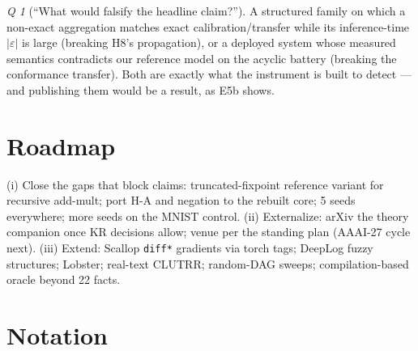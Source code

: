 \documentclass[10pt]{article}
\theoremstyle{remark}
\newtheorem{question}{Q}
\newcommand{\eps}{\varepsilon}
\begin{document}
\begin{question}[``What would falsify the headline claim?'']
A structured family on which a non-exact aggregation matches exact calibration/transfer while its
inference-time $\lvert\eps\rvert$ is large (breaking H8's propagation), or a deployed system whose
measured semantics contradicts our reference model on the acyclic battery (breaking the
conformance transfer). Both are exactly what the instrument is built to detect --- and publishing
them would be a result, as E5b shows.
\end{question}

\section{Roadmap}\label{sec:roadmap}

(i) Close the gaps that block claims: truncated-fixpoint reference variant for recursive add-mult;
port H-A and negation to the rebuilt core; 5 seeds everywhere; more seeds on the MNIST control.
(ii) Externalize: arXiv the theory
companion once KR decisions allow; venue per the standing plan (AAAI-27 cycle next).
(iii) Extend: Scallop \texttt{diff*} gradients via torch tags; DeepLog fuzzy structures; Lobster;
real-text CLUTRR; random-DAG sweeps; compilation-based oracle beyond 22 facts.

\appendix
\section{Notation}\label{app:notation}
\end{document}
